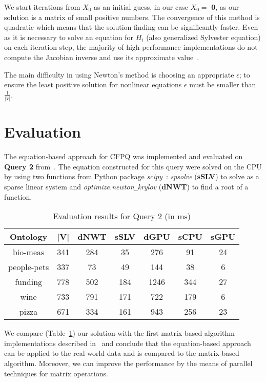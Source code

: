 \documentclass[sigconf]{acmart}
\begin{document}
We start iterations from $X_0$ as an initial guess, in our case $X_0 = $ \textbf{0}, as our solution is a matrix of small positive numbers.
The convergence of this method is quadratic which means that the solution finding can be significantly faster.
Even as it is necessary to solve an equation for $H_i$ (also generalized Sylvester equation) on each iteration step, the majority of high-performance implementations do not compute the Jacobian inverse and use its approximate value~\cite{knoll2004jacobian}.

The main difficulty in using Newton's method is choosing an appropriate $\epsilon$; to ensure the least positive solution for nonlinear equations $\epsilon$ must be smaller than $\frac{1}{|V|}$.


\section{Evaluation}

The equation-based approach for CFPQ was implemented and evaluated on \textbf{Query 2} from~\cite{azimov2018context}.
The equation constructed for this query were solved on the CPU by using two functions from Python package \textit{scipy}~\cite{scipy}:
\textit{spsolve} (\textbf{sSLV}) to solve as a sparse linear system
and
\textit{optimize.newton\texttt{\_}krylov} (\textbf{dNWT}) to find a root of a function.

\begin{table}[h]
\centering
\caption{Evaluation results for Query 2 (in ms)}
\label{tbl2}
\begin{tabular}{ | c | c || c | c || c | c | c |}
\hline
Ontology    & |V| & dNWT & sSLV & dGPU & sCPU &  sGPU \\
\hline
\hline
bio-meas    & 341 &  284 & 35   & 276  & 91  & 24\\
people-pets & 337 &  73  & 49   & 144  & 38  & 6\\
funding     & 778 &  502 & 184  & 1246 & 344 & 27\\
wine        & 733 &  791 & 171  & 722  & 179 & 6\\
pizza       & 671 &  334 & 161  & 943  & 256 & 23\\
\hline
\end{tabular}

\end{table}

We compare (Table~\ref{tbl2}) our solution with the first matrix-based algorithm implementations described in~\cite{azimov2018context} and conclude that the equation-based approach can be applied to the real-world data and is compared to the matrix-based algorithm.
Moreover, we can improve the performance by the means of parallel techniques for matrix operations.
\end{document}
